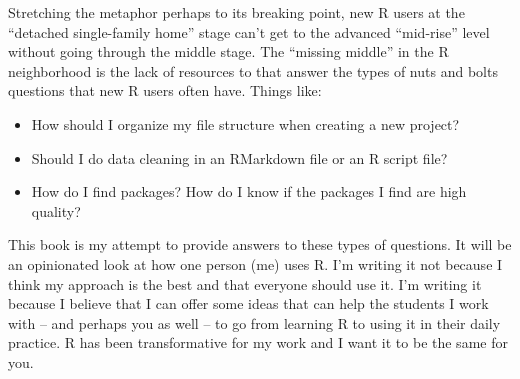 \documentclass[]{book}
\providecommand{\tightlist}{%
  \setlength{\itemsep}{0pt}\setlength{\parskip}{0pt}}
\begin{document}
Stretching the metaphor perhaps to its breaking point, new R users at the ``detached single-family home'' stage can't get to the advanced ``mid-rise'' level without going through the middle stage. The ``missing middle'' in the R neighborhood is the lack of resources to that answer the types of nuts and bolts questions that new R users often have. Things like:

\begin{itemize}
\tightlist
\item
  How should I organize my file structure when creating a new project?
\item
  Should I do data cleaning in an RMarkdown file or an R script file?
\item
  How do I find packages? How do I know if the packages I find are high quality?
\end{itemize}

This book is my attempt to provide answers to these types of questions. It will be an opinionated look at how one person (me) uses R. I'm writing it not because I think my approach is the best and that everyone should use it. I'm writing it because I believe that I can offer some ideas that can help the students I work with -- and perhaps you as well -- to go from learning R to using it in their daily practice. R has been transformative for my work and I want it to be the same for you.


\end{document}
